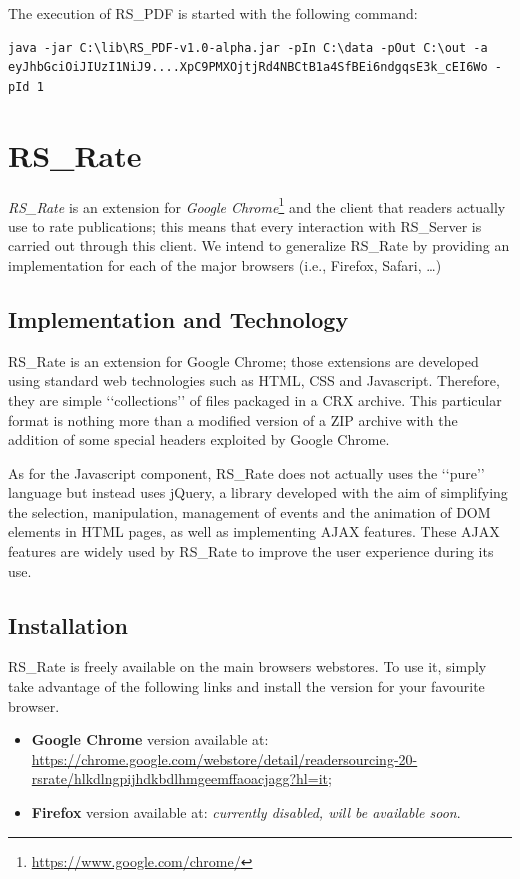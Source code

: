 \documentclass[a4paper, english]{article}
\begin{document}
The execution of RS\_PDF is started with the following command:
\begin{lstlisting}
java -jar C:\lib\RS_PDF-v1.0-alpha.jar -pIn C:\data -pOut C:\out -a eyJhbGciOiJIUzI1NiJ9....XpC9PMXOjtjRd4NBCtB1a4SfBEi6ndgqsE3k_cEI6Wo -pId 1
\end{lstlisting}

\section{RS\_Rate}

\emph{RS\_Rate} is an extension for \emph{Google Chrome}\footnote{\url{https://www.google.com/chrome/}} and the client that readers actually use to rate publications; this means that every interaction with RS\_Server is carried out through this client. We intend to generalize RS\_Rate by providing an implementation for each of the major browsers (i.e., Firefox, Safari, \dots)

\subsection{Implementation and Technology}

RS\_Rate is an extension for Google Chrome; those extensions are developed using standard web technologies such as HTML, CSS and Javascript. Therefore, they are simple \lq\lq collections\rq\rq{} of files packaged in a CRX archive. This particular format is nothing more than a modified version of a ZIP archive with the addition of some special headers exploited by Google Chrome.

As for the Javascript component, RS\_Rate does not actually uses the \lq\lq pure\rq\rq{} language but instead uses jQuery, a library developed with the aim of simplifying the selection, manipulation, management of events and the animation of DOM elements in HTML pages, as well as implementing AJAX features. These AJAX features are widely used by RS\_Rate to improve the user experience during its use.

\subsection{Installation}

RS\_Rate is freely available on the main browsers webstores. To use it, simply take advantage of the following links and install the version for your favourite browser.
\begin{itemize}
\item \textbf{Google Chrome} version available at: \url{https://chrome.google.com/webstore/detail/readersourcing-20-rsrate/hlkdlngpijhdkbdlhmgeemffaoacjagg?hl=it};
\item \textbf{Firefox} version available at: \emph{currently disabled, will be available soon}.
\end{itemize}

\newpage

\printbibliography[heading=bibintoc]
\end{document}
